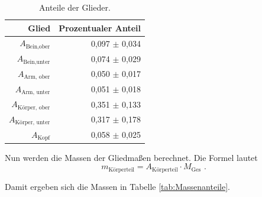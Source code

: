 \begin{table}
  \centering
  \caption{Anteile der Glieder.}
  \label{tab:AnteileKörper}
  \begin{tabular}{rr}
  \toprule
  Glied & Prozentualer Anteil \\
  \midrule
  $A_{\text{Bein,ober}}$      & 0,097 $\pm$ 0,034 \\
  $A_{\text{Bein,unter}}$     & 0,074 $\pm$ 0,029 \\
  $A_{\text{Arm, ober}}$      & 0,050 $\pm$ 0,017 \\
  $A_{\text{Arm, unter}}$     & 0,051 $\pm$ 0,018 \\
  $A_{\text{Körper, ober}}$   & 0,351 $\pm$ 0,133 \\
  $A_{\text{Körper, unter}}$  & 0,317 $\pm$ 0,178 \\
  $A_{\text{Kopf}}$           & 0,058 $\pm$ 0,025 \\
  \bottomrule
\end{tabular}
\end{table}


Nun werden die Massen der Gliedmaßen berechnet. Die Formel lautet
\begin{equation*}
  m_{\text{Körperteil}} = A_{\text{Körperteil}} \cdot M_{\text{Ges}} \text{ .}
\end{equation*}

Damit ergeben sich die Massen in Tabelle {\ref{tab:Massenanteile}}.



